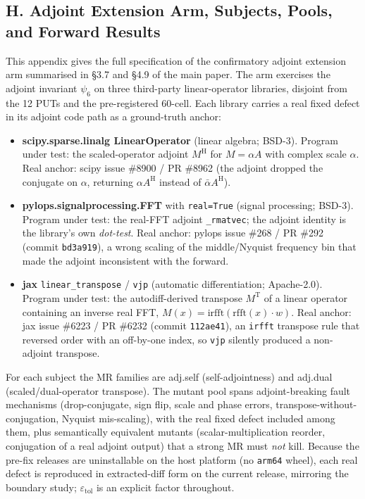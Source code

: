 \documentclass[review,12pt,authoryear]{elsarticle}
\providecommand{\tightlist}{\setlength{\itemsep}{0pt}\setlength{\parskip}{0pt}}
\begin{document}
\subsection{H. Adjoint Extension Arm, Subjects, Pools, and Forward
Results}\label{h.-adjoint-extension-arm}

This appendix gives the full specification of the confirmatory adjoint
extension arm summarised in §3.7 and §4.9 of the main paper. The arm
exercises the adjoint invariant $\psi_6$ on three third-party
linear-operator libraries, disjoint from the 12 PUTs and the
pre-registered 60-cell. Each library carries a real fixed defect in its
adjoint code path as a ground-truth anchor:

\begin{itemize}
\tightlist
\item
  \textbf{scipy.sparse.linalg LinearOperator} (linear algebra; BSD-3).
  Program under test: the scaled-operator adjoint $M^{\mathrm{H}}$ for
  $M = \alpha A$ with complex scale $\alpha$. Real anchor: scipy issue
  \#8900 / PR \#8962 (the adjoint dropped the conjugate on $\alpha$,
  returning $\alpha A^{\mathrm{H}}$ instead of $\bar{\alpha}
  A^{\mathrm{H}}$).
\item
  \textbf{pylops.signalprocessing.FFT} with \texttt{real=True} (signal
  processing; BSD-3). Program under test: the real-FFT adjoint
  \texttt{\_rmatvec}; the adjoint identity is the library's own
  \emph{dot-test}. Real anchor: pylops issue \#268 / PR \#292 (commit
  \texttt{bd3a919}), a wrong scaling of the middle/Nyquist frequency bin
  that made the adjoint inconsistent with the forward.
\item
  \textbf{jax} \texttt{linear\_transpose} / \texttt{vjp} (automatic
  differentiation; Apache-2.0). Program under test: the autodiff-derived
  transpose $M^{\mathrm{T}}$ of a linear operator containing an inverse
  real FFT, $M(x) = \mathrm{irfft}(\mathrm{rfft}(x)\cdot w)$. Real anchor:
  jax issue \#6223 / PR \#6232 (commit \texttt{112ae41}), an
  \texttt{irfft} transpose rule that reversed order with an off-by-one
  index, so \texttt{vjp} silently produced a non-adjoint transpose.
\end{itemize}

For each subject the MR families are adj.self (self-adjointness) and
adj.dual (scaled/dual-operator transpose). The mutant pool spans
adjoint-breaking fault mechanisms (drop-conjugate, sign flip, scale and
phase errors, transpose-without-conjugation, Nyquist mis-scaling), with
the real fixed defect included among them, plus semantically equivalent
mutants (scalar-multiplication reorder, conjugation of a real adjoint
output) that a strong MR must \emph{not} kill. Because the pre-fix
releases are uninstallable on the host platform (no \texttt{arm64} wheel),
each real defect is reproduced in extracted-diff form on the current
release, mirroring the boundary study; $\varepsilon_{\mathrm{tol}}$ is an
explicit factor throughout.
\end{document}
